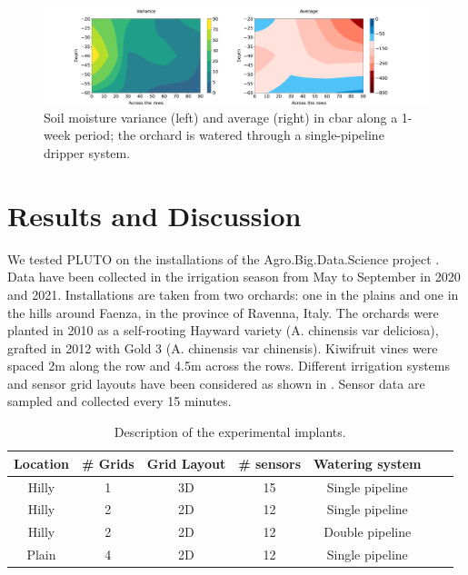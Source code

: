 \begin{figure}[t]
\centering
\includegraphics[scale=.25]{chapters/physics-aware/pluto/img/countor_plot_std_mean.pdf}
\caption{Soil moisture variance (left) and average (right) in cbar along a 1-week period; the orchard is watered through a single-pipeline dripper system.}
\label{pluto-fig:variazione-umidita-profilo}
\end{figure}

\section{Results and Discussion}
\label{pluto-sec:ResultsAndDiscussion}
We tested PLUTO on the installations of the Agro.Big.Data.Science project \cite{ABDS}.
Data have been collected in the irrigation season from May to September in 2020 and 2021.
Installations are taken from two orchards: one in the plains and one in the hills around Faenza, in the province of Ravenna, Italy.
The orchards were planted in 2010 as a self-rooting Hayward variety (A. chinensis var deliciosa), grafted in 2012 with Gold 3 (A. chinensis var chinensis). 
Kiwifruit vines were spaced 2m along the row and 4.5m across the rows.
Different irrigation systems and sensor grid layouts have been considered as shown in .
Sensor data are sampled and collected every 15 minutes. 
\begin{table}[t]
\centering
\begin{tabular}{@{}ccccccc@{}}
\toprule
Location & \# Grids & Grid Layout & \# sensors & Watering system \\ \midrule
Hilly & 1 & 3D & 15 & Single pipeline \\
Hilly & 2 & 2D & 12 & Single pipeline \\
Hilly & 2 & 2D & 12 & Double pipeline \\
Plain & 4 & 2D & 12 & Single pipeline \\ \bottomrule
\end{tabular}
\caption{Description of the experimental implants.}\label{pluto-tbl:implants}
\end{table}

